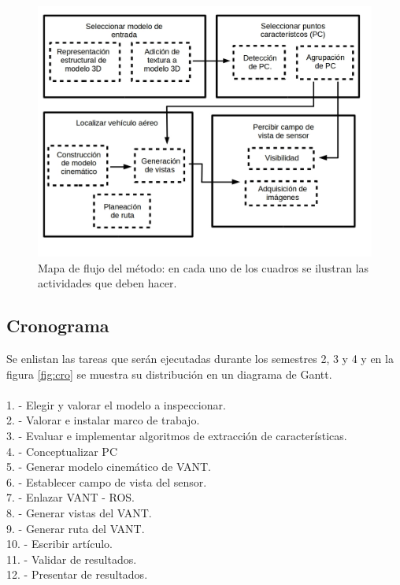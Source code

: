 \documentclass[]{report}
\begin{document}
\begin{figure}[h]
\centering
\includegraphics[scale = 0.5]{mapa.jpg}
\caption{Mapa de flujo del método: en cada uno de los cuadros se ilustran las actividades que deben hacer.}
\label{fig:met}
\end{figure}



\subsection{Cronograma}

Se enlistan las tareas que serán ejecutadas durante los semestres 2, 3 y 4 y en la figura \ref {fig:cro}  se muestra su distribución en un diagrama de Gantt.\\\\
1. - Elegir y valorar el modelo a inspeccionar.\\
2. - Valorar e instalar marco de trabajo.\\
3. - Evaluar e implementar algoritmos de extracción de características.\\
4. - Conceptualizar PC\\
5. - Generar modelo cinemático de VANT.\\
6. - Establecer campo de vista del sensor.\\
7. - Enlazar VANT - ROS.\\
8. - Generar vistas del VANT.\\
9. - Generar ruta del VANT.\\
10. - Escribir artículo.\\
11. - Validar de resultados.\\
12. - Presentar de resultados.\\
\end{document}
